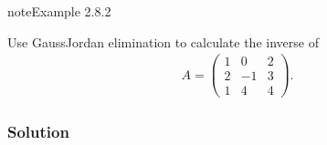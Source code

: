 \documentclass[letterpaper,10pt,english]{jupyterBook}
\begin{document}
\label{_pages/2.5_Gauss_Jordan_elimination:gauss-jordan-inverse-example}
\begin{sphinxadmonition}{note}{Example 2.8.2}



\sphinxAtStartPar
Use Gauss\sphinxhyphen{}Jordan elimination to calculate the inverse of
\begin{equation*}
\begin{split} A =
\begin{pmatrix}
  1 & 0 & 2 \\
  2 & -1 & 3 \\
  1 & 4 & 4
\end{pmatrix}.\end{split}
\end{equation*}\subsubsection*{Solution}


\end{sphinxadmonition}
\end{document}
